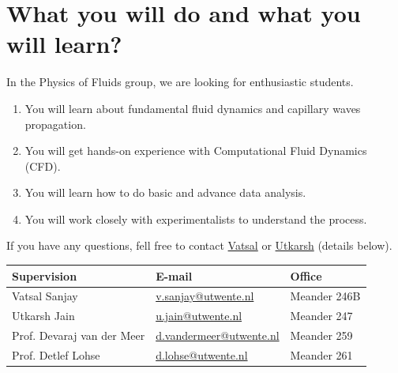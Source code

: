 \documentclass[a4paper,10pt]{article}
\begin{document}
\section*{What you will do and what you will learn?}
In the Physics of Fluids group, we are looking for enthusiastic students.
\begin{enumerate}
\itemsep0em
\item You will learn about fundamental fluid dynamics and capillary waves propagation.
\item You will get hands-on experience with Computational Fluid Dynamics (CFD).
\item You will learn how to do basic and advance data analysis.
\item You will work closely with experimentalists to understand the process.
\end{enumerate}
If you have any questions, fell free to contact \href{mailto:v.sanjay@utwente.nl}{Vatsal} or \href{mailto:u.jain@utwente.nl}{Utkarsh} (details below).
\begin{center}
\begin{tabular}{|l|l|l|}
\hline \textbf{Supervision} & \textbf{E-mail} & \textbf{Office} \\
\hline Vatsal Sanjay & \href{mailto:v.sanjay@utwente.nl}{v.sanjay@utwente.nl} & Meander 246B \\
\hline Utkarsh Jain   & \href{mailto:u.jain@utwente.nl}{u.jain@utwente.nl}& Meander 247 \\
\hline Prof. Devaraj van der Meer & \href{mailto:d.vandermeer@utwente.nl}{d.vandermeer@utwente.nl} & Meander 259  \\
\hline Prof. Detlef Lohse & \href{mailto:d.lohse@utwente.nl}{d.lohse@utwente.nl} & Meander 261  \\
\hline
\end{tabular}
\end{center}
\printbibliography
\end{document}
